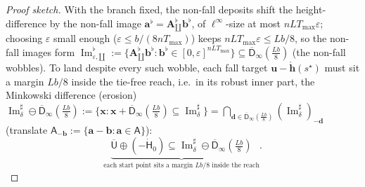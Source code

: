 \documentclass[11pt]{article}
\theoremstyle{definition}
\begin{document}
\begin{proof}[Proof sketch]
\smallskip\noindent With the branch fixed, the non-fall deposits shift the height-difference by the non-fall image $\mathbf{a}^{\flat}=\mathbf{A}^{\flat}_{\amalg}\mathbf{b}^{\flat}$, of $\ell^\infty$-size at most $nLT_{\max}\varepsilon$; choosing $\varepsilon$ small enough ($\varepsilon\leq b/(8nT_{\max})$) keeps $nLT_{\max}\varepsilon\leq Lb/8$, so the non-fall images form $\operatorname{Im}^{\flat}_{\varepsilon,\amalg} := \{\mathbf{A}^{\flat}_{\amalg}\mathbf{b}^{\flat} : \mathbf{b}^{\flat}\in[0,\varepsilon]^{nLT_{\max}}\}\subseteq\overline{\mathsf{D}}_\infty(\tfrac{Lb}{8})$ (the non-fall wobbles). To land despite every such wobble, each fall target $\mathbf{u}-\mathring{\mathbf{h}}(s^{\star})$ must sit a margin $Lb/8$ inside the tie-free reach, i.e.\ in its robust inner part, the Minkowski difference (erosion) $\operatorname{Im}^{\sharp}_{\delta}\ominus\overline{\mathsf{D}}_\infty(\tfrac{Lb}{8}) := \{\mathbf{x} : \mathbf{x}+\overline{\mathsf{D}}_\infty(\tfrac{Lb}{8})\subseteq\operatorname{Im}^{\sharp}_{\delta}\} = \bigcap_{\mathbf{d}\in\overline{\mathsf{D}}_\infty(\tfrac{Lb}{8})}(\operatorname{Im}^{\sharp}_{\delta})_{-\mathbf{d}}$ (translate $\mathsf{A}_{-\mathbf{b}} := \{\mathbf{a}-\mathbf{b} : \mathbf{a}\in\mathsf{A}\}$):
\[
  \underbrace{\overline{\mathsf{U}}\oplus(-\dot{\mathsf{H}}_0)\subseteq\operatorname{Im}^{\sharp}_{\delta}\ominus\overline{\mathsf{D}}_\infty(\tfrac{Lb}{8})}_{\text{each start point sits a margin }Lb/8\text{ inside the reach}} .
\]


\end{proof}
\end{document}
